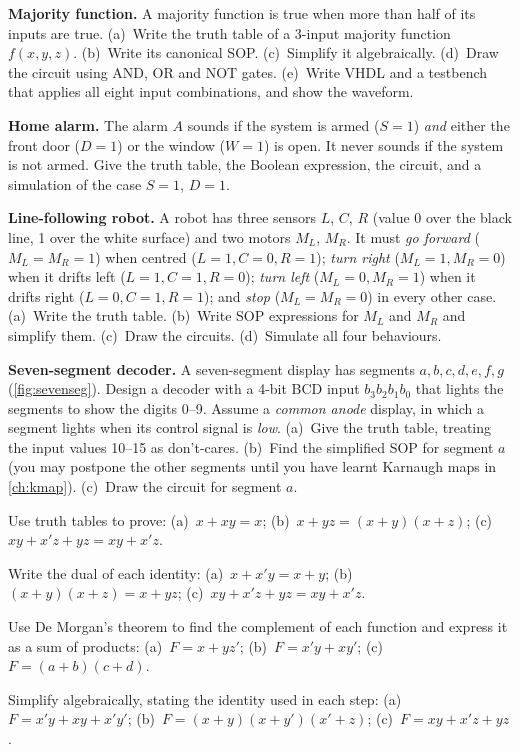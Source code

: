 \begin{exlist}
  \item \textbf{Majority function.} A majority function is true when more than half of its inputs are true. (a)~Write the truth table of a 3-input majority function $f(x,y,z)$. (b)~Write its canonical SOP. (c)~Simplify it algebraically. (d)~Draw the circuit using AND, OR and NOT gates. (e)~Write VHDL and a testbench that applies all eight input combinations, and show the waveform.
  \item \textbf{Home alarm.} The alarm $A$ sounds if the system is armed ($S=1$) \emph{and} either the front door ($D=1$) or the window ($W=1$) is open. It never sounds if the system is not armed. Give the truth table, the Boolean expression, the circuit, and a simulation of the case $S=1$, $D=1$.
  \item \textbf{Line-following robot.} A robot has three sensors $L$, $C$, $R$ (value 0 over the black line, 1 over the white surface) and two motors $M_L$, $M_R$. It must \emph{go forward} ($M_L=M_R=1$) when centred ($L=1,C=0,R=1$); \emph{turn right} ($M_L=1, M_R=0$) when it drifts left ($L=1,C=1,R=0$); \emph{turn left} ($M_L=0,M_R=1$) when it drifts right ($L=0,C=1,R=1$); and \emph{stop} ($M_L=M_R=0$) in every other case. (a)~Write the truth table. (b)~Write SOP expressions for $M_L$ and $M_R$ and simplify them. (c)~Draw the circuits. (d)~Simulate all four behaviours.
  \item \textbf{Seven-segment decoder.} A seven-segment display has segments $a,b,c,d,e,f,g$ (\cref{fig:sevenseg}). Design a decoder with a 4-bit BCD input $b_3b_2b_1b_0$ that lights the segments to show the digits 0--9. Assume a \emph{common anode} display, in which a segment lights when its control signal is \emph{low}. (a)~Give the truth table, treating the input values 10--15 as don't-cares. (b)~Find the simplified SOP for segment $a$ (you may postpone the other segments until you have learnt Karnaugh maps in \cref{ch:kmap}). (c)~Draw the circuit for segment $a$.
  \item Use truth tables to prove: (a)~$x+xy=x$; (b)~$x+yz=(x+y)(x+z)$; (c)~$xy+x'z+yz=xy+x'z$.
  \item Write the dual of each identity: (a)~$x+x'y=x+y$; (b)~$(x+y)(x+z)=x+yz$; (c)~$xy+x'z+yz = xy+x'z$.
  \item Use De Morgan's theorem to find the complement of each function and express it as a sum of products: (a)~$F=x+yz'$; (b)~$F=x'y+xy'$; (c)~$F=(a+b)(c+d)$.
  \item Simplify algebraically, stating the identity used in each step: (a)~$F=x'y+xy+x'y'$; (b)~$F=(x+y)(x+y')(x'+z)$; (c)~$F=xy+x'z+yz$.

\end{exlist}

